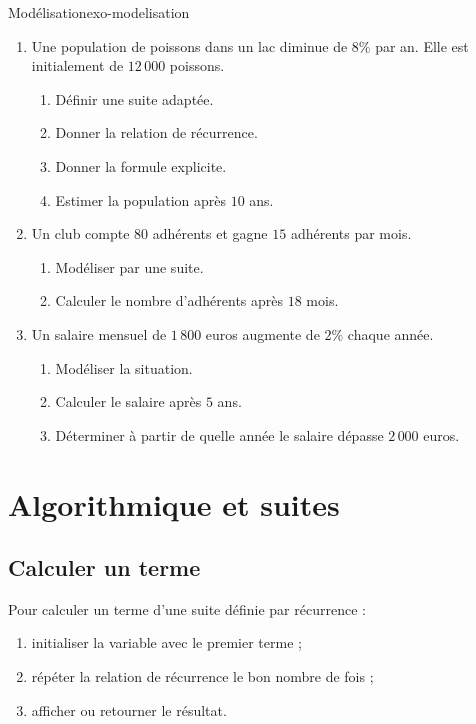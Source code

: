 \documentclass[11pt,a4paper]{article}
\begin{document}
\begin{exercisebox}{Modélisation}{exo-modelisation}
\begin{enumerate}
  \item Une population de poissons dans un lac diminue de $8\%$ par an. Elle est initialement de $12\,000$ poissons.
  \begin{enumerate}
    \item Définir une suite adaptée.
    \item Donner la relation de récurrence.
    \item Donner la formule explicite.
    \item Estimer la population après $10$ ans.
  \end{enumerate}
  \item Un club compte $80$ adhérents et gagne $15$ adhérents par mois.
  \begin{enumerate}
    \item Modéliser par une suite.
    \item Calculer le nombre d'adhérents après $18$ mois.
  \end{enumerate}
  \item Un salaire mensuel de $1\,800$ euros augmente de $2\%$ chaque année.
  \begin{enumerate}
    \item Modéliser la situation.
    \item Calculer le salaire après $5$ ans.
    \item Déterminer à partir de quelle année le salaire dépasse $2\,000$ euros.
  \end{enumerate}
\end{enumerate}
\end{exercisebox}

\section{Algorithmique et suites}

\subsection{Calculer un terme}

\begin{methodbox}
Pour calculer un terme d'une suite définie par récurrence :
\begin{enumerate}
  \item initialiser la variable avec le premier terme ;
  \item répéter la relation de récurrence le bon nombre de fois ;
  \item afficher ou retourner le résultat.
\end{enumerate}
\end{methodbox}
\end{document}

